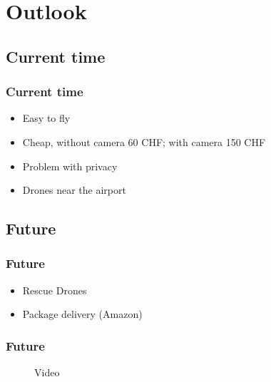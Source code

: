 \section{Outlook}

\begin{frame}
\tableofcontents[
    currentsection, 
    sectionstyle=show/shaded, 
    subsectionstyle=hide
]
\end{frame}


\subsection*{Current time}
\begin{frame}
\frametitle{Current time}

  \begin{itemize}
    \item Easy to fly
    \item Cheap, without camera 60 CHF; with camera 150 CHF 
    \item Problem with privacy    
    \item Drones near the airport
  \end{itemize}
\end{frame}


\subsection*{Future}
\begin{frame}
\frametitle{Future}

  \begin{itemize}
    \item Rescue Drones   
    \item Package delivery (Amazon)
  \end{itemize}
\end{frame}


\begin{frame}
\frametitle{Future}
\begin{figure}[H]
  \begin{center}
  Video
  \end{center}
\end{figure}

\end{frame}